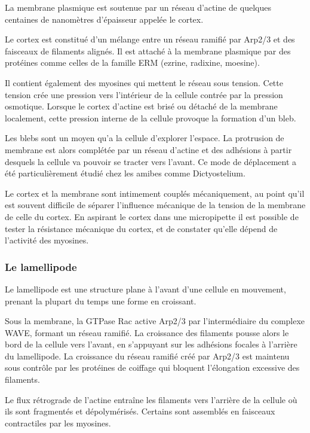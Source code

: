 La membrane plasmique est soutenue par un réseau d'actine de quelques centaines de nanomètres d'épaisseur appelée le cortex.

Le cortex est constitué d'un mélange entre un réseau ramifié par Arp2/3 et des faisceaux de filaments alignés. 
Il est attaché à la membrane plasmique par des protéines comme celles de la famille ERM (ezrine, radixine, moesine). 

Il contient également des myosines qui mettent le réseau sous tension. Cette tension crée une pression vers l'intérieur de la cellule contrée par la pression osmotique. 
Lorsque le cortex d'actine est brisé ou détaché de la membrane localement, cette pression interne de la cellule provoque la formation d'un bleb. 

Les blebs sont un moyen qu'a la cellule d'explorer l'espace. La protrusion de membrane est alors complétée par un réseau d'actine et des adhésions à partir desquels la cellule va pouvoir se tracter vers l'avant. 
Ce mode de déplacement a été particulièrement étudié chez les amibes comme Dictyostelium. 

Le cortex et la membrane sont intimement couplés mécaniquement, au point qu'il est souvent difficile de séparer l'influence mécanique de la tension de la membrane de celle du cortex. 
En aspirant le cortex dans une micropipette il est possible de tester la résistance mécanique du cortex, et de constater qu'elle dépend de l'activité des myosines. 



\subsubsection{Le lamellipode}

Le lamellipode est une structure plane à l'avant d'une cellule en mouvement, prenant la plupart du temps une forme en croissant. 

Sous la membrane, la GTPase Rac active Arp2/3 par l'intermédiaire du complexe WAVE, formant un réseau ramifié.
La croissance des filaments pousse alors le bord de la cellule vers l'avant, en s'appuyant sur les adhésions focales à l'arrière du lamellipode. 
La croissance du réseau ramifié créé par Arp2/3 est maintenu sous contrôle par les protéines de coiffage qui bloquent l'élongation excessive des filaments. 

Le flux rétrograde de l'actine entraîne les filaments vers l'arrière de la cellule où ils sont fragmentés et dépolymérisés. 
Certains sont assemblés en faisceaux contractiles par les myosines. 

